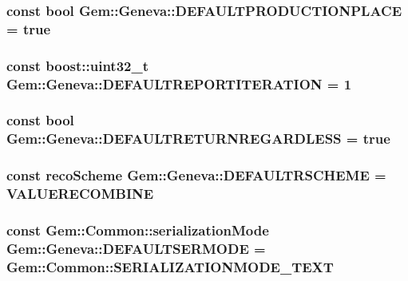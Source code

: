 \label{db/de9/namespaceGem_1_1Geneva_a6c15979db3e3fb1efa968e5444296b01}
\hypertarget{namespaceGem_1_1Geneva_ae70305897c4fb0100476012f61c32ae9}{
\subsubsection[{DEFAULTPRODUCTIONPLACE}]{\setlength{\rightskip}{0pt plus 5cm}const bool {\bf Gem::Geneva::DEFAULTPRODUCTIONPLACE} = true}}
\label{db/de9/namespaceGem_1_1Geneva_ae70305897c4fb0100476012f61c32ae9}
\hypertarget{namespaceGem_1_1Geneva_a2b3f870846aa6ccf4502b14e837707d4}{
\subsubsection[{DEFAULTREPORTITERATION}]{\setlength{\rightskip}{0pt plus 5cm}const boost::uint32\_\-t {\bf Gem::Geneva::DEFAULTREPORTITERATION} = 1}}
\label{db/de9/namespaceGem_1_1Geneva_a2b3f870846aa6ccf4502b14e837707d4}
\hypertarget{namespaceGem_1_1Geneva_aa28d6ada86d874ce11bde88b5569a34d}{
\subsubsection[{DEFAULTRETURNREGARDLESS}]{\setlength{\rightskip}{0pt plus 5cm}const bool {\bf Gem::Geneva::DEFAULTRETURNREGARDLESS} = true}}
\label{db/de9/namespaceGem_1_1Geneva_aa28d6ada86d874ce11bde88b5569a34d}
\hypertarget{namespaceGem_1_1Geneva_abf07d2c9bf8cc79475a14f410e435cd0}{
\subsubsection[{DEFAULTRSCHEME}]{\setlength{\rightskip}{0pt plus 5cm}const recoScheme {\bf Gem::Geneva::DEFAULTRSCHEME} = VALUERECOMBINE}}
\label{db/de9/namespaceGem_1_1Geneva_abf07d2c9bf8cc79475a14f410e435cd0}
\hypertarget{namespaceGem_1_1Geneva_abffd76330c5d5bbb1808dd71a3241944}{
\subsubsection[{DEFAULTSERMODE}]{\setlength{\rightskip}{0pt plus 5cm}const Gem::Common::serializationMode {\bf Gem::Geneva::DEFAULTSERMODE} = Gem::Common::SERIALIZATIONMODE\_\-TEXT}}
